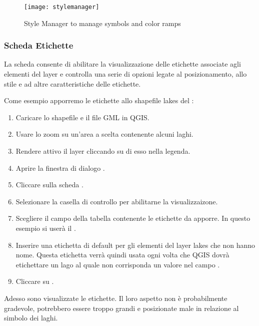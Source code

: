 \begin{figure}[ht]
   \begin{center}
   \caption{Style Manager to manage symbols and color ramps \nixcaption}\label{fig:stylemanager}\smallskip
   \texttt{[image: stylemanager]}
\end{center}
\end{figure}

\subsubsection{Scheda Etichette}

La scheda  consente di abilitare la visualizzazione delle
etichette associate agli elementi del layer e controlla una serie di
opzioni legate al posizionamento, allo stile e ad altre caratteristiche delle
etichette.

Come esempio apporremo le etichette allo shapefile lakes del
:

\begin{enumerate}
\item Caricare lo shapefile  e il file GML  in QGIS.
\item Usare lo zoom su un'area a scelta contenente alcuni laghi.
\item Rendere attivo il layer  cliccando su di esso nella
legenda.
\item Aprire la finestra di dialogo .
\item Cliccare sulla scheda .
\item Selezionare la casella di controllo  per
abilitarne la visualizzaizone.
\item Scegliere il campo della tabella contenente le etichette da apporre. 
  In questo esempio si userà il .
\item Inserire una etichetta di default per gli elementi del layer lakes che
non hanno nome. Questa etichetta verrà quindi usata ogni volta che QGIS dovrà
etichettare un lago al quale non corrisponda un valore nel campo .
\item Cliccare su .
\end{enumerate} 

Adesso sono visualizzate le etichette. Il loro aspetto non è probabilmente
gradevole, potrebbero essere troppo grandi e posizionate male in relazione al
simbolo dei laghi.

